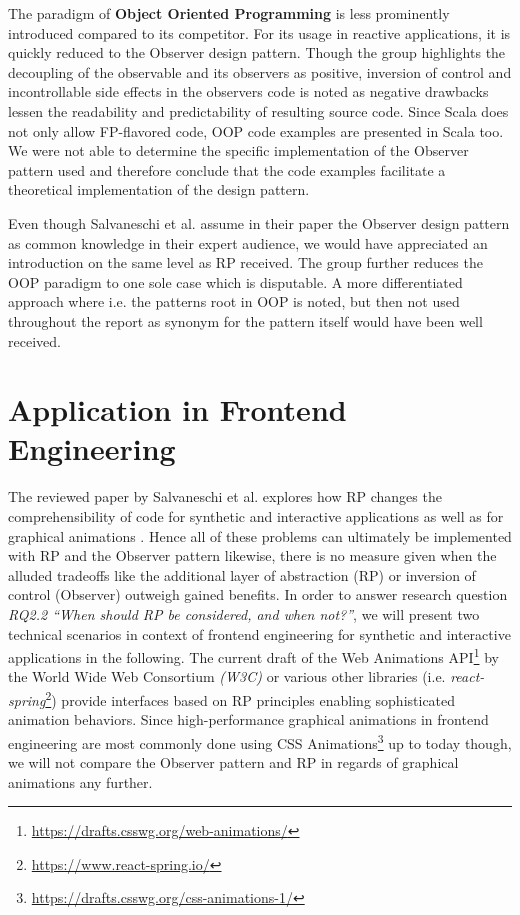 \documentclass[12pt,a4paper]{article}
\begin{document}
The paradigm of \textbf{Object Oriented Programming} is less prominently introduced compared to its competitor. For its usage in reactive applications, it is quickly reduced to the Observer design pattern. Though the group highlights the decoupling of the observable and its observers as positive, inversion of control and incontrollable side effects in the observers code is noted as negative drawbacks lessen the readability and predictability of resulting source code. Since Scala does not only allow FP-flavored code, OOP code examples are presented in Scala too. We were not able to determine the specific implementation of the Observer pattern used and therefore conclude that the code examples facilitate a theoretical implementation of the design pattern.

Even though Salvaneschi et al. assume in their paper the Observer design pattern as common knowledge in their expert audience, we would have appreciated an introduction on the same level as RP received. The group further reduces the OOP paradigm to one sole case which is disputable. A more differentiated approach where i.e. the patterns root in OOP is noted, but then not used throughout the report as synonym for the pattern itself would have been well received.

\section{Application in Frontend Engineering}
\label{sec:practical-application}

The reviewed paper by Salvaneschi et al. explores how RP changes the comprehensibility of code for synthetic and interactive applications as well as for graphical animations \cite{7827078}. Hence all of these problems can ultimately be implemented with RP and the Observer pattern likewise, there is no measure given when the alluded tradeoffs like the additional layer of abstraction (RP) or inversion of control (Observer) outweigh gained benefits. In order to answer research question \emph{RQ2.2 ``When should RP be considered, and when not?''}, we will present two technical scenarios in context of frontend engineering for synthetic and interactive applications in the following. The current draft of the Web Animations API\footnote{\url{https://drafts.csswg.org/web-animations/}} by the World Wide Web Consortium \emph{(W3C)} or various other libraries (i.e. \emph{react-spring}\footnote{\url{https://www.react-spring.io/}}) provide interfaces based on RP principles enabling sophisticated animation behaviors. Since high-performance graphical animations in frontend engineering are most commonly done using CSS Animations\footnote{\url{https://drafts.csswg.org/css-animations-1/}} up to today though, we will not compare the Observer pattern and RP in regards of graphical animations any further.
\end{document}
